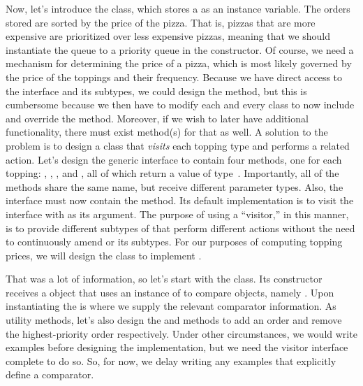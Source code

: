 Now, let's introduce the  class, which stores a  as an instance variable.
The orders stored are sorted by the price of the pizza.
That is, pizzas that are more expensive are prioritized over less expensive pizzas, meaning that we should instantiate the queue to a priority queue in the constructor.
Of course, we need a mechanism for determining the price of a pizza, which is most likely governed by the price of the toppings and their frequency.
Because we have direct access to the  interface and its subtypes, we could design the  method, but this is cumbersome because we then have to modify each and every class to now include and override the method.
Moreover, if we wish to later have additional functionality, there must exist method(s) for that as well.
A solution to the problem is to design a class that \emph{visits} each topping type and performs a related action.
Let's design the generic  interface to contain four methods, one for each topping: , , , and , all of which return a value of type~. 
Importantly, all of the methods share the same name, but receive different parameter types.
Also, the  interface must now contain the  method. 
Its default implementation is to visit the interface  with  as its argument. 
The purpose of using a ``visitor,'' in this manner, is to provide different subtypes of  that perform different actions without the need to continuously amend  or its subtypes.
For our purposes of computing topping prices, we will design the  class to implement . 

That was a lot of information, so let's start with the  class. Its constructor receives a  object that uses an instance of  to compare objects, namely .
Upon instantiating the  is where we supply the relevant comparator information.
As utility methods, let's also design the  and  methods to add an order and remove the highest-priority order respectively.
Under other circumstances, we would write examples before designing the implementation, but we need the visitor interface complete to do so.
So, for now, we delay writing any examples that explicitly define a comparator.

